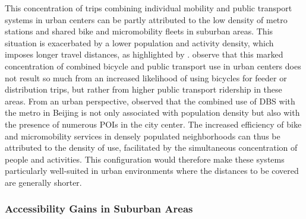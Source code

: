 \begin{refsegment}
This concentration of trips combining individual mobility and public transport systems in urban centers can be partly attributed to the low density of metro stations and shared bike and micromobility fleets in suburban areas. This situation is exacerbated by a lower population and activity density, which imposes longer travel distances, as highlighted by \textcolor{blue}{\textcite[12]{liu_use_2020}}. \textcolor{blue}{\textcite[104]{wang_bicycle-transit_2013}} observe that this marked concentration of combined bicycle and public transport use in urban centers does not result so much from an increased likelihood of using bicycles for feeder or distribution trips, but rather from higher public transport ridership in these areas. From an urban perspective, \textcolor{blue}{\textcite[9]{li_exploring_2022}} observed that the combined use of \acrshort{DBS} with the metro in Beijing is not only associated with population density but also with the presence of numerous \acrshort{POIs} in the city center. The increased efficiency of bike and micromobility services in densely populated neighborhoods can thus be attributed to the density of use, facilitated by the simultaneous concentration of people and activities. This configuration would therefore make these systems particularly well-suited in urban environments where the distances to be covered are generally shorter.%

\subsubsection*{Accessibility Gains in Suburban Areas
    \label{chap2:gains-accessibility-periurban}
    }


\end{refsegment}

